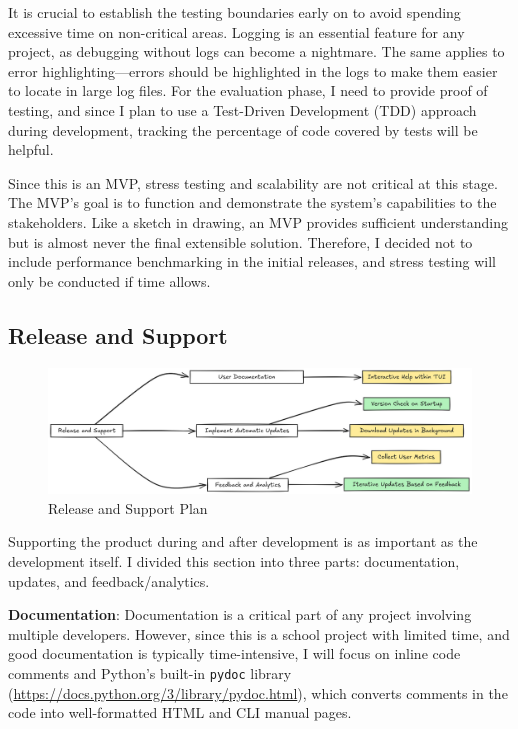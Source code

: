 \documentclass[10pt , a4paper]{report}
\begin{document}
It is crucial to establish the testing boundaries early on to avoid spending excessive time on non-critical areas. Logging is an essential feature for any project, as debugging without logs can become a nightmare. The same applies to error highlighting—errors should be highlighted in the logs to make them easier to locate in large log files. For the evaluation phase, I need to provide proof of testing, and since I plan to use a Test-Driven Development (TDD) approach during development, tracking the percentage of code covered by tests will be helpful.

Since this is an MVP, stress testing and scalability are not critical at this stage. The MVP's goal is to function and demonstrate the system's capabilities to the stakeholders. Like a sketch in drawing, an MVP provides sufficient understanding but is almost never the final extensible solution. Therefore, I decided not to include performance benchmarking in the initial releases, and stress testing will only be conducted if time allows.

\subsection{Release and Support}
\begin{figure}[htbp]
    \centering
    \includegraphics[width=1\linewidth]{imgs/ReleaseSupportDiagram.png}
    \caption{Release and Support Plan}
    \label{fig:release_support}
\end{figure}

Supporting the product during and after development is as important as the development itself. I divided this section into three parts: documentation, updates, and feedback/analytics.

\textbf{Documentation}: Documentation is a critical part of any project involving multiple developers. However, since this is a school project with limited time, and good documentation is typically time-intensive, I will focus on inline code comments and Python's built-in \texttt{pydoc} library (\url{https://docs.python.org/3/library/pydoc.html}), which converts comments in the code into well-formatted HTML and CLI manual pages.
\end{document}
